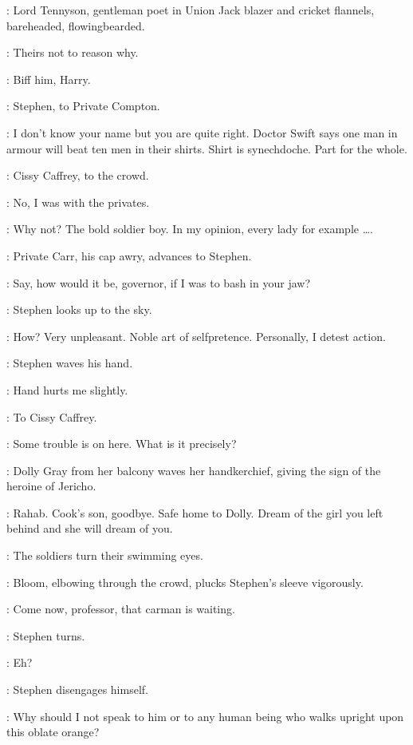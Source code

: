 :
Lord Tennyson, gentleman poet in Union Jack blazer and cricket flannels,
bareheaded, flowingbearded.

\LordTennyson:
Theirs not to reason why.

\Compton:
Biff him, Harry.

:
Stephen, to Private Compton.

\Stephen:
I don't know your name but you are quite right.
Doctor Swift says one man in armour will beat ten men in their shirts.
Shirt is synechdoche.
Part for the whole.

:
Cissy Caffrey, to the crowd.

\Cissy:
No, I was with the privates.

\Stephen:
Why not?
The bold soldier boy.
In my opinion, every lady for example \ldots.

:
Private Carr, his cap awry, advances to Stephen.

\Carr:
Say, how would it be, governor, if I was to bash in your jaw?

:
Stephen looks up to the sky.

\Stephen:
How?
Very unpleasant.
Noble art of selfpretence.
Personally, I detest action.

:
Stephen waves his hand.

\Stephen:
Hand hurts me slightly.

:
To Cissy Caffrey.

\Stephen:
Some trouble is on here.
What is it precisely?

:
Dolly Gray from her balcony waves her handkerchief,
giving the sign of the heroine of Jericho.

\DollyGray:
Rahab.
Cook's son, goodbye.
Safe home to Dolly.
Dream of the girl you left behind
and she will dream of you.

:
The soldiers turn their swimming eyes.

:
Bloom, elbowing through the crowd, plucks Stephen's sleeve vigorously.

\Bloom:
Come now, professor, that carman is waiting.

:
Stephen turns.

\Stephen:
Eh?

:
Stephen disengages himself.

\Stephen:
Why should I not speak to him or to any human being
who walks upright upon this oblate orange?

